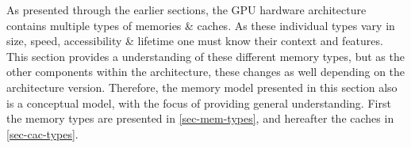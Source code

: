 
As presented through the earlier sections, the GPU hardware architecture contains multiple types of memories \& caches.
As these individual types vary in size, speed, accessibility \& lifetime one must know their context and features.
This section provides a understanding of these different memory types, but as the other components within the architecture, these changes as well depending on the architecture version.
Therefore, the memory model presented in this section also is a conceptual model, with the focus of providing general understanding.
First the memory types are presented in \cref{sec-mem-types}, and hereafter the caches in \cref{sec-cac-types}.

